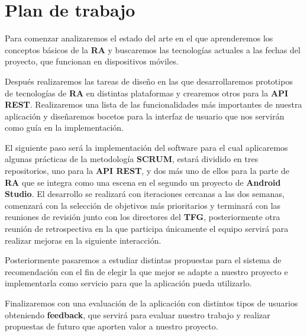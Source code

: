\newpage
\section{Plan de trabajo}
\begin{flushleft}
    Para comenzar analizaremos el estado del arte en el que aprenderemos los conceptos
     básicos de la \textbf{RA} y buscaremos las tecnologías actuales a las fechas del proyecto,
     que funcionan en dispositivos móviles.
\end{flushleft}

\begin{flushleft}     
    Después realizaremos las tareas de diseño en las que desarrollaremos prototipos de
     tecnologías de \textbf{RA} en distintas plataformas y crearemos otros para la \textbf{API REST}.
     Realizaremos una lista de las funcionalidades más importantes de nuestra aplicación
     y diseñaremos bocetos para la interfaz de usuario que nos servirán como guía en
     la implementación.
\end{flushleft}

\begin{flushleft}    
    El siguiente paso será la implementación del software para el cual aplicaremos
     algunas prácticas de la metodología \textbf{SCRUM}, estará dividido en tres repositorios, uno para la
     \textbf{API REST}, y dos más uno de ellos para la parte de \textbf{RA} que se integra como una
     escena en el segundo un proyecto de \textbf{Android Studio}. El desarrollo se realizará
     con iteraciones cercanas a las dos semanas, comenzará con la selección de
     objetivos más prioritarios y terminará con las reuniones de revisión junto
     con los directores del \textbf{TFG}, posteriormente otra reunión de retrospectiva en
     la que participa únicamente el equipo servirá para realizar mejoras en la
     siguiente interacción.
\end{flushleft}

\begin{flushleft}
    Posteriormente pasaremos a estudiar distintas propuestas para el sistema
     de recomendación con el fin de elegir la que mejor se adapte a nuestro
     proyecto e implementarla como servicio para que la aplicación pueda
     utilizarlo.
\end{flushleft}

\begin{flushleft}        
    Finalizaremos con una evaluación de la aplicación con distintos tipos de
     usuarios obteniendo \textbf{feedback}, que servirá para evaluar nuestro trabajo y
     realizar propuestas de futuro que aporten valor a nuestro proyecto.
\end{flushleft}
\label{makereference1.3}




